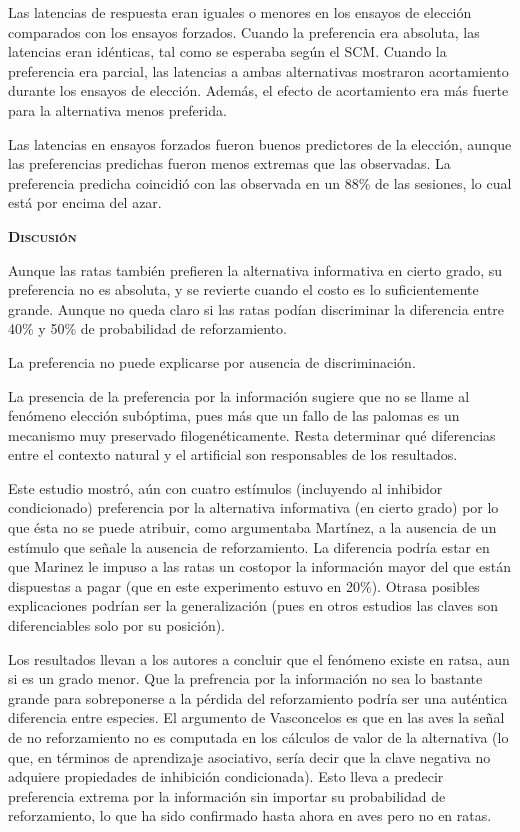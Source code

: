 \documentclass[a4paper,12pt]{article}
\begin{document}
Las latencias de respuesta eran iguales o menores en los ensayos de elección comparados con los ensayos forzados. Cuando la preferencia era absoluta, las latencias eran idénticas, tal como se esperaba según el SCM. Cuando la preferencia era parcial, las latencias a ambas alternativas mostraron acortamiento durante los ensayos de elección. Además, el efecto de acortamiento era más fuerte para la alternativa menos preferida.

Las latencias en ensayos forzados fueron buenos predictores de la elección, aunque las preferencias predichas fueron menos extremas que las observadas. La preferencia predicha coincidió con las observada en un 88\% de las sesiones, lo cual está por encima del azar.

{\scshape\bfseries Discusión}

Aunque las ratas también prefieren la alternativa informativa en cierto grado, su preferencia no es absoluta, y se revierte cuando el costo es lo suficientemente grande. Aunque no queda claro si las ratas podían discriminar la diferencia entre 40\% y 50\% de probabilidad de reforzamiento.

La preferencia no puede explicarse por ausencia de discriminación.

La presencia de la preferencia por la información sugiere que no se llame al fenómeno elección subóptima, pues más que un fallo de las palomas es un mecanismo muy preservado filogenéticamente. Resta determinar qué diferencias entre el contexto natural y el artificial son responsables de los resultados.

Este estudio mostró, aún con cuatro estímulos (incluyendo al inhibidor condicionado) preferencia por la alternativa informativa (en cierto grado) por lo que ésta no se puede atribuir, como argumentaba Martínez, a la ausencia de un estímulo que señale la ausencia de reforzamiento. La diferencia podría estar en que Marinez le impuso a las ratas un costopor la información mayor del que están dispuestas a pagar (que en este experimento estuvo en 20\%). Otrasa posibles explicaciones podrían ser la generalización (pues en otros estudios las claves son diferenciables solo por su posición).

Los resultados llevan a los autores a concluir que el fenómeno existe en ratsa, aun si es un grado menor. Que la prefrencia por la información no sea lo bastante grande para sobreponerse a la pérdida del reforzamiento podría ser una auténtica diferencia entre especies. El argumento de Vasconcelos es que en las aves la señal de no reforzamiento no es computada en los cálculos de valor de la alternativa (lo que, en términos de aprendizaje asociativo, sería decir que la clave negativa no adquiere propiedades de inhibición condicionada). Esto lleva a predecir preferencia extrema por la información sin importar su probabilidad de reforzamiento, lo que ha sido confirmado hasta ahora en aves pero no en ratas.
\end{document}
